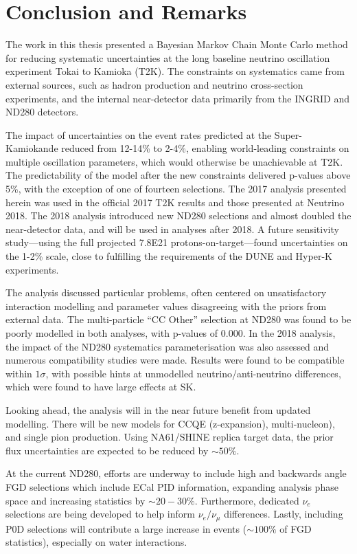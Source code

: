 \chapter{Conclusion and Remarks}
\label{chap:conclusion}
The work in this thesis presented a Bayesian Markov Chain Monte Carlo method for reducing systematic uncertainties at the long baseline neutrino oscillation experiment Tokai to Kamioka (T2K). The constraints on systematics came from external sources, such as hadron production and neutrino cross-section experiments, and the internal near-detector data primarily from the INGRID and ND280 detectors.

The impact of uncertainties on the event rates predicted at the Super-Kamiokande reduced from 12-14\% to 2-4\%, enabling world-leading constraints on multiple oscillation parameters, which would otherwise be unachievable at T2K. The predictability of the model after the new constraints delivered p-values above 5\%, with the exception of one of fourteen selections. The 2017 analysis presented herein was used in the official 2017 T2K results and those presented at Neutrino 2018. The 2018 analysis introduced new ND280 selections and almost doubled the near-detector data, and will be used in analyses after 2018. A future sensitivity study---using the full projected 7.8E21 protons-on-target---found uncertainties on the 1-2\% scale, close to fulfilling the requirements of the DUNE and Hyper-K experiments.

The analysis discussed particular problems, often centered on unsatisfactory interaction modelling and parameter values disagreeing with the priors from external data. The multi-particle ``CC Other'' selection at ND280 was found to be poorly modelled in both analyses, with p-values of 0.000. In the 2018 analysis, the impact of the ND280 systematics parameterisation was also assessed and numerous compatibility studies were made. Results were found to be compatible within $1\sigma$, with possible hints at unmodelled neutrino/anti-neutrino differences, which were found to have large effects at SK.

Looking ahead, the analysis will in the near future benefit from updated modelling. There will be new models for CCQE (z-expansion\cite{z-exp}), multi-nucleon\cite{nieves1}), and single pion production\cite{thesis_minoo}. Using NA61/SHINE replica target data, the prior flux uncertainties are expected to be reduced by $\sim50\%$\cite{flux_red}.

At the current ND280, efforts are underway to include high and backwards angle FGD selections which include ECal PID information, expanding analysis phase space and increasing statistics by $\sim20-30\%$. Furthermore, dedicated $\nu_e$ selections are being developed to help inform $\nu_e/\nu_\mu$ differences. Lastly, including P0D selections will contribute a large increase in events ($\sim100\%$ of FGD statistics), especially on water interactions.

